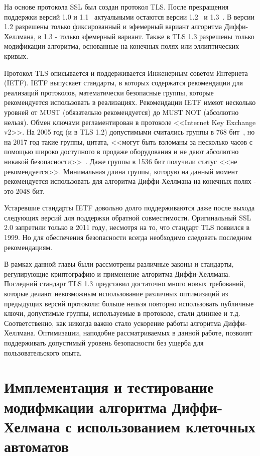 \documentclass[times,specification,annotation]{itmo-student-thesis}
\begin{document}
На основе протокола SSL был создан протокол TLS.
После прекращения поддержки версий 1.0 и 1.1~\cite{mor20} актуальными остаются версии 1.2~\cite{rfc5246} и 1.3~\cite{rfc8446}.
В версии 1.2 разрешены только фиксированный и эфемерный вариант алгоритма Диффи-Хеллмана, в 1.3 - только эфемерный вариант.
Также в TLS 1.3 разрешены только модификации алгоритма, основанные на конечных полях или эллиптических кривых.

Протокол TLS описывается и поддерживается Инженерным советом Интернета (IETF).
IETF выпускает стандарты, в которых содержатся рекомендации для реализаций протоколов,
математически безопасные группы, которые рекомендуется использовать в реализациях.
Рекомендации IETF имеют несколько уровней от MUST (обязательно рекомендуется) до MUST NOT (абсолютно нельзя).
Обмен ключами регламентирован в протоколе <<Internet Key Exchange v2>>.
На 2005 год (и в TLS 1.2) допустимыми считались группы в 768 бит~\cite{rfc4307}, но на 2017 год
такие группы, цитата, <<могут быть взломаны за несколько часов с помощью широко доступного
в продаже оборудования и не дают абсолютно никакой безопасности>>~\cite{rfc8247}.
Даже группы в 1536 бит получили статус <<не рекомендуется>>.
Минимальная длина группы, которую на данный момент рекомендуется использовать для
алгоритма Диффи-Хеллмана на конечных полях - это 2048 бит.

Устаревшие стандарты IETF довольно долго поддерживаются даже после выхода следующих версий для поддержки обратной совместимости.
Оригинальный SSL 2.0 запретили только в 2011 году, несмотря на то, что стандарт TLS появился в 1999.
Но для обеспечения безопасности всегда необходимо следовать последним рекомендациям.

\chapterconclusion

В рамках данной главы были рассмотрены различные законы и стандарты, регулирующие криптографию и применение алгоритма
Диффи-Хеллмана.
Последний стандарт TLS 1.3 представил достаточно много новых требований, которые делают невозможным использование
различных оптимизаций из предыдущих версий протокола: больше нельзя повторно использовать публичные ключи, допустимые
группы, используемые в протоколе, стали длиннее и т.д.
Соответственно, как никогда важно стало ускорение работы алгоритма Диффи-Хеллмана.
Оптимизации, наподобие рассматриваемых в данной работе, позволят поддерживать допустимый уровень безопасности
без ущерба для пользовательского опыта.

\chapter{Имплементация и тестирование модифмкации алгоритма Диффи-Хелмана с использованием клеточных автоматов}
\end{document}
